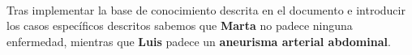 \documentclass[10pt, a4paper,spanish]{article}
\begin{document}
			\paragraph{}
			Tras implementar la base de conocimiento descrita en el documento e introducir los casos específicos descritos sabemos que \textbf{Marta} no padece ninguna enfermedad, mientras que \textbf{Luis} padece un \textbf{aneurisma arterial abdominal}.
\end{document}
